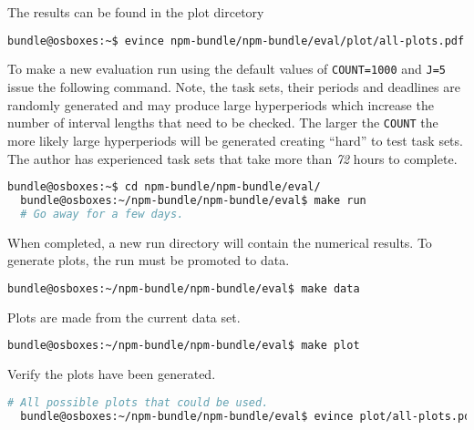 \documentclass[a4paper]{article}
\begin{document}
{\noindent}The results can be found in the plot dircetory
\begin{lstlisting}[language=bash]
  bundle@osboxes:~$ evince npm-bundle/npm-bundle/eval/plot/all-plots.pdf
\end{lstlisting}

{\noindent}To make a new evaluation run using the default values of
\texttt{COUNT=1000} and \texttt{J=5} issue the following
command. Note, the task sets, their periods and deadlines are randomly
generated and may produce large hyperperiods which increase the number
of interval lengths that need to be checked. The larger the
\texttt{COUNT} the more likely large hyperperiods will be generated
creating ``hard'' to test task sets. The author has experienced task
sets that take more than \emph{72} hours to complete.

\begin{lstlisting}[language=bash]
  bundle@osboxes:~$ cd npm-bundle/npm-bundle/eval/
  bundle@osboxes:~/npm-bundle/npm-bundle/eval$ make run
  # Go away for a few days.
\end{lstlisting}

{\noindent}When completed, a new run directory will contain the
numerical results. To generate plots, the run must be promoted to
data. 

\begin{lstlisting}[language=bash]
  bundle@osboxes:~/npm-bundle/npm-bundle/eval$ make data
\end{lstlisting}

{\noindent}Plots are made from the current data set.
\begin{lstlisting}[language=bash]
  bundle@osboxes:~/npm-bundle/npm-bundle/eval$ make plot
\end{lstlisting}

{\noindent}Verify the plots have been generated.
\begin{lstlisting}[language=bash]
  # All possible plots that could be used.
  bundle@osboxes:~/npm-bundle/npm-bundle/eval$ evince plot/all-plots.pdf
\end{lstlisting}
\end{document}
